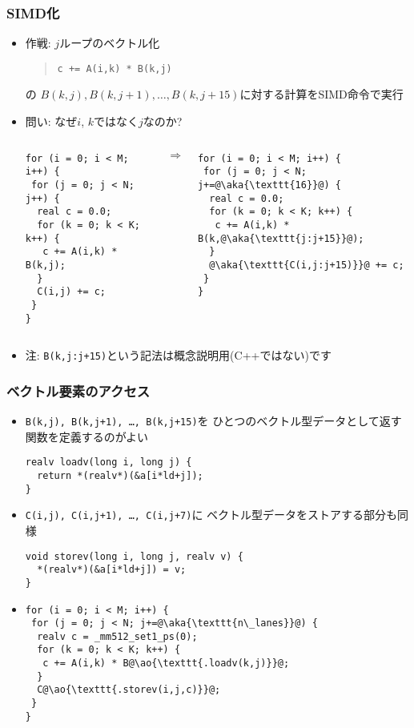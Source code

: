 \documentclass[10pt,dvipdfmx]{beamer}
\newcommand{\ao}[1]{{\color{blue}#1}}
\newcommand{\aka}[1]{{\color{red}#1}}
\begin{document}
\begin{frame}[fragile]
\frametitle{SIMD化}
\begin{itemize}
\item 作戦: $j$ループのベクトル化

\begin{quote}
{\tt c += A(i,k) * B(k,j)}
\end{quote}

の $B(k,j),B(k,j+1), \ldots, B(k,j+15)$に対する計算をSIMD命令で実行
\item 問い: なぜ$i$, $k$ではなく$j$なのか?
\begin{columns}
\begin{column}{0.45\textwidth}
\begin{lstlisting}
for (i = 0; i < M; i++) {
 for (j = 0; j < N; j++) {
  real c = 0.0;
  for (k = 0; k < K; k++) {
   c += A(i,k) * B(k,j);
  }
  C(i,j) += c;
 }
}
\end{lstlisting}
\end{column}
\begin{column}{0.1\textwidth}
$\Rightarrow$
\end{column}
\begin{column}{0.45\textwidth}
\begin{lstlisting}
for (i = 0; i < M; i++) {
 for (j = 0; j < N; j+=@\aka{\texttt{16}}@) {
  real c = 0.0;
  for (k = 0; k < K; k++) {
   c += A(i,k) * B(k,@\aka{\texttt{j:j+15}}@);
  }
  @\aka{\texttt{C(i,j:j+15)}}@ += c;
 }
}
\end{lstlisting}
\end{column}
\end{columns}
\item [] 注: \texttt{B(k,j:j+15)}という記法は概念説明用(C++ではない)です
\end{itemize}
\end{frame}

\begin{frame}[fragile]
\frametitle{ベクトル要素のアクセス}
\begin{itemize}
\item \texttt{B(k,j), B(k,j+1), \ldots , B(k,j+15)}を
  ひとつのベクトル型データとして返す関数を定義するのがよい
\begin{lstlisting}
realv loadv(long i, long j) {
  return *(realv*)(&a[i*ld+j]);
}
\end{lstlisting}
\item \texttt{C(i,j), C(i,j+1), \ldots , C(i,j+7)}に
  ベクトル型データをストアする部分も同様
\begin{lstlisting}
void storev(long i, long j, realv v) {
  *(realv*)(&a[i*ld+j]) = v;
}
\end{lstlisting}

\item[]
\begin{lstlisting}
for (i = 0; i < M; i++) {
 for (j = 0; j < N; j+=@\aka{\texttt{n\_lanes}}@) {
  realv c = _mm512_set1_ps(0);
  for (k = 0; k < K; k++) {
   c += A(i,k) * B@\ao{\texttt{.loadv(k,j)}}@;
  }
  C@\ao{\texttt{.storev(i,j,c)}}@;
 }
}
\end{lstlisting}
\end{itemize}
\end{frame}
\end{document}
